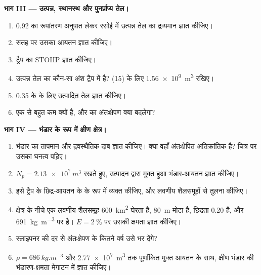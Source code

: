 \begin{problem}
\noindent\textbf{भाग III --- उत्पन्न, स्थानस्थ और पुनर्प्राप्य तेल।}
\begin{enumerate}[resume]
  \item 0.92 का रूपांतरण अनुपात लेकर रसोई में उत्पन्न तेल का द्रव्यमान ज्ञात कीजिए।
  \item सतह पर उसका आयतन ज्ञात कीजिए।
  \item ट्रैप का STOIIP ज्ञात कीजिए।
  \item उत्पन्न तेल का कौन-सा अंश ट्रैप में है? (15) के लिए \qty{1.56e9}{m^3} रखिए।
  \item 0.35 के  के लिए उत्पादित तेल ज्ञात कीजिए।
  \item {} एक से बहुत कम क्यों है, और  का अंतःक्षेपण क्या बदलेगा?
\end{enumerate}

\noindent\textbf{भाग IV ---  भंडार के रूप में क्षीण क्षेत्र।}
\begin{enumerate}[resume]
  \item भंडार का तापमान और द्रवस्थैतिक दाब ज्ञात कीजिए। क्या वहाँ अंतःक्षेपित 
        अतिक्रांतिक है? चित्र पर उसका घनत्व पढ़िए।
  \item $N_p = \qty{2.13e7}{m^3}$ रखते हुए, उत्पादन द्वारा मुक्त हुआ भंडार-आयतन ज्ञात कीजिए।
  \item इसे ट्रैप के छिद्र-आयतन के  के रूप में व्यक्त कीजिए, और
        लवणीय शैलसमूहों से तुलना कीजिए।
  \item क्षेत्र के नीचे एक लवणीय शैलसमूह \qty{600}{km^2} घेरता है, \qty{80}{m} मोटा है,
        छिद्रता 0.20 है, और  \qty{691}{kg.m^{-3}} पर है। $E =
        \qty{2}{\percent}$ पर उसकी क्षमता ज्ञात कीजिए।
  \item स्लाइपनर की दर से अंतःक्षेपण के कितने वर्ष उसे भर देंगे?
  \item $\rho = \qty{686}{kg.m^{-3}}$ और \qty{2.77e7}{m^3} तक पूर्णांकित मुक्त आयतन के साथ, क्षीण भंडार की
         भंडारण-क्षमता मेगाटन में ज्ञात कीजिए।
\end{enumerate}
\end{problem}
